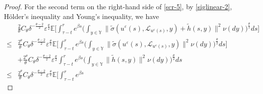 \documentclass[11pt]{article}
\numberwithin{equation}{section}
\theoremstyle{plain}
\begin{document}
\begin{proof}
For the second term on the right-hand side of \eqref{scr-5},  
by \eqref{siglinear-2}, H\"{o}lder's inequality and Young's inequality, we have    
\begin{align} \label{scr-6}
      & \frac{2}{\theta} C_{\theta} 
          \delta^{-\frac{\theta - 2}{2} } \varepsilon^{\frac{\theta}{2} }
          	         \mathbb{E}
          	              \bigg[ \int_{\tau-t}^{r} e^{\beta s}
                                       \Big( \int_{y \in \mathbb{Y} }
                                                    \| \widetilde{\sigma}(u^{\varepsilon}(s),        
                                                                                        \mathcal{L}_{u^{\varepsilon}(s) }, y)
 	                                                    + \widetilde{h}(s,y)
 	                                                \|^{2}
 	                                            \nu(dy)
 	                                    \Big)^{\frac{\theta}{2} }  ds
 	                     \bigg]  \nonumber\\
\le & \frac{2^{\theta} }{\theta} C_{\theta} 
         \delta^{-\frac{\theta - 2}{2} } \varepsilon^{\frac{\theta}{2} }
          	         \mathbb{E}
          	              \bigg[ \int_{\tau-t}^{r} e^{\beta s}
                                       \Big( \int_{y \in \mathbb{Y} }
                                                    \| \widetilde{\sigma}(u^{\varepsilon}(s),        
                                                                                        \mathcal{L}_{u^{\varepsilon}(s) }, y)
                                                    \|^2
                                               \nu(dy)  
                                        \Big)^{\frac{\theta}{2} }     
                                     ds
                        \bigg]   \nonumber\\                     
 	   & + \frac{2^{\theta}}{\theta} C_{\theta} 
 	          \delta^{-\frac{\theta - 2}{2} } \varepsilon^{\frac{\theta}{2} }
 	             	         \int_{\tau-t}^{r} e^{\beta s}
 	                                          \Big( \int_{y \in \mathbb{Y} }
 	                                                       \| \widetilde{h}(s,y) \|^{2}
 	                                                    \nu(dy)
 	                                           \Big)^{\frac{\theta}{2} } ds  \nonumber\\
\le & \frac{2^{\theta} }{\theta} C_{\theta} 
        \delta^{-\frac{\theta - 2}{2} } \varepsilon^{\frac{\theta}{2} }
          	         \mathbb{E}
          	              \bigg[ \int_{\tau-t}^{r} e^{\beta s}

\end{align}
\end{proof}
\end{document}
